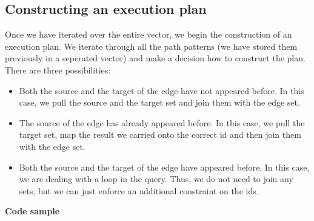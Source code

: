 \documentclass[11pt,singlecolumn]{scrartcl}
\begin{document}
\subsection{Constructing an execution plan}
Once we have iterated over the entire vector, we begin the construction of an execution plan. We iterate through all the path patterns (we have stored them previously in a seperated vector) and make a decision how to construct the plan. There are three possibilities:
\begin{itemize}
\item Both the source and the target of the edge have not appeared before. In this case, we pull the source and the target set and join them with the edge set. 
\item The source of the edge has already appeared before. In this case, we pull the target set, map the result we carried onto the correct id and then join them with the edge set.
\item Both the source and the target of the edge have appeared before. In this case, we are dealing with a loop in the query. Thus, we do not need to join any sets, but we can just enforce an additional constraint on the ids.
\end{itemize}
\textbf{Code sample}\\\\
\end{document}
